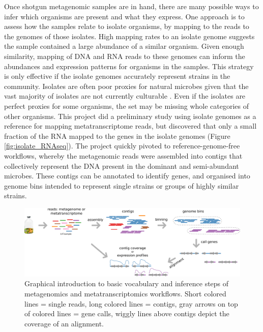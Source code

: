 Once shotgun metagenomic samples are in hand, there are many possible ways to infer which organisms are present and what they express.
One approach is to assess how the samples relate to isolate organisms, by mapping to the reads to the genomes of those isolates.
High mapping rates to an isolate genome suggests the sample contained a large abundance of a similar organism.
Given enough similarity, mapping of DNA and RNA reads to these genomes can inform the abundances and expression patterns for organisms in the samples.
This strategy is only effective if the isolate genomes accurately represent strains in the community.
Isolates are often poor proxies for natural microbes given that the vast majority of isolates are not currently culturable \cite{kaeberlein2002, stewart2012}.
Even if the isolates are perfect proxies for some organisms, the set may be missing whole categories of other organisms.
This project did a preliminary study using isolate genomes as a reference for mapping metatranscriptome reads, but discovered that only a small fraction of the RNA mapped to the genes in the isolate genomes (Figure \ref{fig:isolate_RNAseq}).
The project quickly pivoted to reference-genome-free workflows, whereby the metagenomic reads were assembled into contigs that collectively represent the DNA present in the dominant and semi-abundant microbes.
These contigs can be annotated to identify genes, and organised into genome bins intended to represent single strains or groups of highly similar strains.

\begin{figure}[H]
\centering
    \includegraphics[width=1.0\textwidth]{./tex/chapter2/figures/170312_metagenomics_metatranscriptomics_overview.pdf}
    \begin{singlespace}
    \caption[Overview of elements in metagenomics/metatranscriptomics workflows]{
       Graphical introduction to basic vocabulary and inference steps of metagenomics and metatranscriptomics workflows.
	   Short colored lines = single reads, long colored lines = contigs,
	   gray arrows on top of colored lines = gene calls, wiggly lines above contigs depict the coverage of an alignment.}
    \label{fig:meta_workflow}
    \end{singlespace}
\end{figure}

